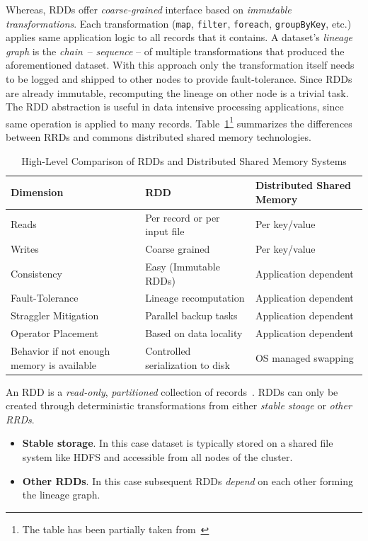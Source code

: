 Whereas, RDDs offer \emph{coarse-grained} interface based on \emph{immutable transformations}. Each transformation (\lstinline$map$, \lstinline$filter$, \lstinline$foreach$, \lstinline$groupByKey$, etc.) applies same application logic to all records that it contains. A dataset's \emph{lineage graph} is the \emph{chain}~-- \emph{sequence} -- of multiple transformations that produced the aforementioned dataset. With this approach only the transformation itself needs to be logged and shipped to other nodes to provide fault-tolerance. Since RDDs are already immutable, recomputing the lineage on other node is a trivial task. The RDD abstraction is useful in data intensive processing applications, since same operation is applied to many records. Table~\ref{tab:rdd-vs-dsm}\footnote{The table has been partially taken from~\cite{Zaharia:2012}} summarizes the differences between RRDs and commons distributed shared memory technologies.
\begin{table}[h]
    \begin{tabular}{lll}
        \toprule
        \textbf{Dimension} & \textbf{RDD} & \textbf{Distributed Shared Memory}\\
        \midrule
        Reads & Per record or per input file & Per key/value \\
        Writes & Coarse grained & Per key/value \\
        Consistency & Easy (Immutable RDDs) & Application dependent \\
        Fault-Tolerance & Lineage recomputation & Application dependent \\
        Straggler Mitigation & Parallel backup tasks & Application dependent \\
        Operator Placement & Based on data locality & Application dependent \\
        Behavior if not enough memory is available & Controlled serialization to disk & OS managed swapping\\
        \bottomrule
    \end{tabular}
    \centering
    \caption{High-Level Comparison of RDDs and Distributed Shared Memory Systems}
    \label{tab:rdd-vs-dsm}
\end{table}

An RDD is a \emph{read-only}, \emph{partitioned} collection of records~\cite{Zaharia:2012}. RDDs can only be created through deterministic transformations from either \emph{stable stoage} or \emph{other RRDs}.
\begin{itemize}
    \item \textbf{Stable storage}. In this case dataset is typically stored on a shared file system like HDFS and accessible from all nodes of the cluster.
    \item \textbf{Other RDDs}. In this case subsequent RDDs \emph{depend} on each other forming the lineage graph.
\end{itemize}

